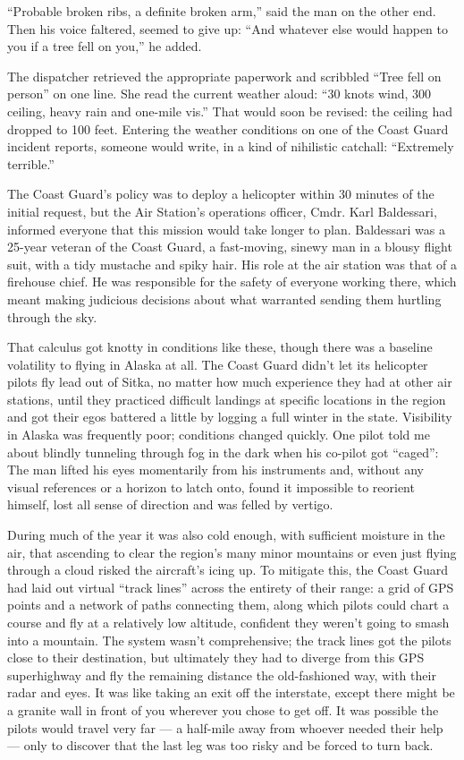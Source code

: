 ``Probable broken ribs, a definite broken arm,'' said the man on the
other end. Then his voice faltered, seemed to give up: ``And whatever
else would happen to you if a tree fell on you,'' he added.

The dispatcher retrieved the appropriate paperwork and scribbled ``Tree
fell on person'' on one line. She read the current weather aloud: ``30
knots wind, 300 ceiling, heavy rain and one-mile vis.'' That would soon
be revised: the ceiling had dropped to 100 feet. Entering the weather
conditions on one of the Coast Guard incident reports, someone would
write, in a kind of nihilistic catchall: ``Extremely terrible.''

The Coast Guard's policy was to deploy a helicopter within 30 minutes of
the initial request, but the Air Station's operations officer, Cmdr.
Karl Baldessari, informed everyone that this mission would take longer
to plan. Baldessari was a 25-year veteran of the Coast Guard, a
fast-moving, sinewy man in a blousy flight suit, with a tidy mustache
and spiky hair. His role at the air station was that of a firehouse
chief. He was responsible for the safety of everyone working there,
which meant making judicious decisions about what warranted sending them
hurtling through the sky.

That calculus got knotty in conditions like these, though there was a
baseline volatility to flying in Alaska at all. The Coast Guard didn't
let its helicopter pilots fly lead out of Sitka, no matter how much
experience they had at other air stations, until they practiced
difficult landings at specific locations in the region and got their
egos battered a little by logging a full winter in the state. Visibility
in Alaska was frequently poor; conditions changed quickly. One pilot
told me about blindly tunneling through fog in the dark when his
co-pilot got ``caged'': The man lifted his eyes momentarily from his
instruments and, without any visual references or a horizon to latch
onto, found it impossible to reorient himself, lost all sense of
direction and was felled by vertigo.

During much of the year it was also cold enough, with sufficient
moisture in the air, that ascending to clear the region's many minor
mountains or even just flying through a cloud risked the aircraft's
icing up. To mitigate this, the Coast Guard had laid out virtual ``track
lines'' across the entirety of their range: a grid of GPS points and a
network of paths connecting them, along which pilots could chart a
course and fly at a relatively low altitude, confident they weren't
going to smash into a mountain. The system wasn't comprehensive; the
track lines got the pilots close to their destination, but ultimately
they had to diverge from this GPS superhighway and fly the remaining
distance the old-fashioned way, with their radar and eyes. It was like
taking an exit off the interstate, except there might be a granite wall
in front of you wherever you chose to get off. It was possible the
pilots would travel very far --- a half-mile away from whoever needed
their help --- only to discover that the last leg was too risky and be
forced to turn back.

